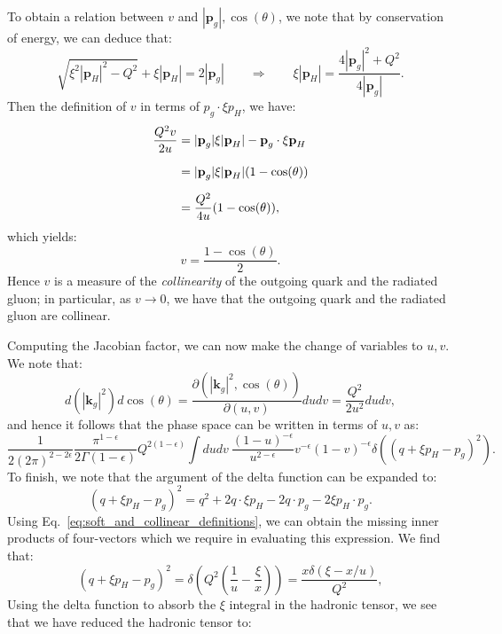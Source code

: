 \documentclass[withindex,glossary]{cam-thesis}
\renewcommand{\vec}[1]{\textbf{#1}} %
\begin{document}
To obtain a relation between $v$ and $|\vec{p}_g|, \cos(\theta)$, we note that by conservation of energy, we can deduce that:
\begin{equation}
 \sqrt{\xi^2 |\vec{p}_H|^2 - Q^2} + \xi |\vec{p}_H| = 2 |\vec{p}_g| \qquad \Rightarrow \qquad  \xi |\vec{p}_H| = \frac{4 |\vec{p}_g|^2 + Q^2}{4|\vec{p}_g|}.
\end{equation}
Then the definition of $v$ in terms of $p_g \cdot \xi p_H$, we have:
\begin{align}
\frac{Q^2 v}{2u} &= |\vec{p}_g| \xi | \vec{p}_H| - \vec{p}_g \cdot \xi \vec{p}_H \notag\\[1.5ex]
&= |\vec{p}_g| \xi |\vec{p}_H| (1 - \cos(\theta)) \notag\\[1.5ex]
&= \frac{Q^2}{4u}(1 - \cos(\theta)),
\end{align}
which yields:
\begin{equation}
v = \frac{1 - \cos(\theta)}{2}.
\end{equation}
Hence $v$ is a measure of the \textit{collinearity} of the outgoing quark and the radiated gluon; in particular, as $v \rightarrow 0$, we have that the outgoing quark and the radiated gluon are collinear.

Computing the Jacobian factor, we can now make the change of variables to $u,v$. We note that:
\begin{equation}
d(|\vec{k}_g|^2) d\cos(\theta) = \frac{\partial(|\vec{k}_g|^2, \cos(\theta))}{\partial(u,v)} du dv = \frac{Q^2}{2u^2} du dv,
\end{equation}
and hence it follows that the phase space can be written in terms of $u, v$ as:
\begin{equation}
\frac{1}{2(2\pi)^{2 - 2\epsilon}} \frac{\pi^{1-\epsilon}}{2\Gamma(1-\epsilon)} Q^{2(1-\epsilon)} \int  du dv\ \frac{(1-u)^{-\epsilon}}{u^{2-\epsilon}} v^{-\epsilon} (1-v)^{-\epsilon} \delta( (q + \xi p_H - p_g)^2).
\end{equation}
To finish, we note that the argument of the delta function can be expanded to:
\begin{equation}
(q + \xi p_H - p_g)^2 = q^2 + 2 q \cdot \xi p_H - 2 q \cdot p_g - 2 \xi p_H \cdot p_g.
\end{equation}
Using Eq.~\eqref{eq:soft_and_collinear_definitions}, we can obtain the missing inner products of four-vectors which we require in evaluating this expression. We find that:
\begin{equation}
(q + \xi p_H - p_g)^2 = \delta\left( Q^2 \left( \frac{1}{u} - \frac{\xi}{x} \right) \right) = \frac{x\delta(\xi - x/u)}{Q^2},
\end{equation}
Using the delta function to absorb the $\xi$ integral in the hadronic tensor, we see that we have reduced the hadronic tensor to:
\end{document}
